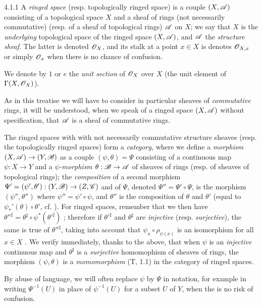 \begin{env}{4.1.1}
\label{env-0.4.1.1}
A \emph{ringed space} (resp. topologically ringed space) is a couple $(X,\mathscr{A})$
consisting of a topological space $X$ and a sheaf of rings (not necessarily commutative)
(resp. of a sheaf of topological rings) $\mathscr{A}$ on $X$; we say that $X$ is the
\emph{underlying} topological space of the ringed space $(X,\mathscr{A})$, and $\mathscr{A}$
the \emph{structure sheaf}. The latter is denoted $\mathscr{O}_X$, and its stalk at a point
$x\in X$ is denotes $\mathscr{O}_{X,x}$ or simply $\mathscr{O}_x$ when there is no chance of confusion.

We denote by $1$ or $e$ the \emph{unit section} of $\mathscr{O}_X$ over $X$ (the unit element
of $\Gamma(X,\mathscr{O}_X)$).

As in this treatise we will have to consider in particular sheaves of \emph{commutative}
rings, it will be understood, when we speak of a ringed space $(X,\mathscr{A})$ without
specification, that $\mathscr{A}$ is a sheaf of commutative rings.

The ringed spaces with with not necessarily commutative structure sheaves
(resp. the topologically ringed spaces) form a \emph{category}, where we define
a \emph{morphism} $(X,\mathscr{A})\to(Y,\mathscr{B})$ as a couple $(\psi,\theta)=\Psi$
consisting of a continuous map $\psi:X\to Y$ and a \emph{$\psi$-morphism}
$\theta:\mathscr{B}\to\mathscr{A}$  of sheaves of rings (resp. of sheaves of
topological rings); the \emph{composition} of a second morphism
$\Psi'=(\psi',\theta'):(Y,\mathscr{B})\to(Z,\mathscr{C})$ and of $\Psi$, denoted
$\Psi''=\Psi'\circ\Psi$, is the morphism $(\psi'',\theta'')$ where $\psi''=\psi'\circ\psi$,
and $\theta''$ is the composition of $\theta$ and $\theta'$ (equal to
$\psi_*'(\theta)\circ\theta'$, cf. ). For ringed spaces, remember that we
then have ${\theta''}^\sharp=\theta^\sharp\circ\psi^*({\theta'}^\sharp)$ ;
therefore if ${\theta'}^\sharp$ and $\theta^\sharp$ are \emph{injective} (resp.
\emph{surjective}), the same is true of ${\theta''}^\sharp$, taking into account that
$\psi_x\circ\rho_{\psi(x)}$ is an isomorphism for all $x\in X$ . We verify
immediately, thanks to the above, that when $\psi$ is an \emph{injective} continuous map and
$\theta^\sharp$ is a \emph{surjective} homomophism of sheaves of rings, the morphism
$(\psi,\theta)$ is a \emph{momomorphism} (T, 1.1) in the category of ringed spaces.

By abuse of language, we will often replace $\psi$ by $\Psi$ in notation, for
example in writing $\Psi^{-1}(U)$ in place of $\psi^{-1}(U)$ for a subset $U$ of $Y$,
when the is no risk of confusion.
\end{env}

